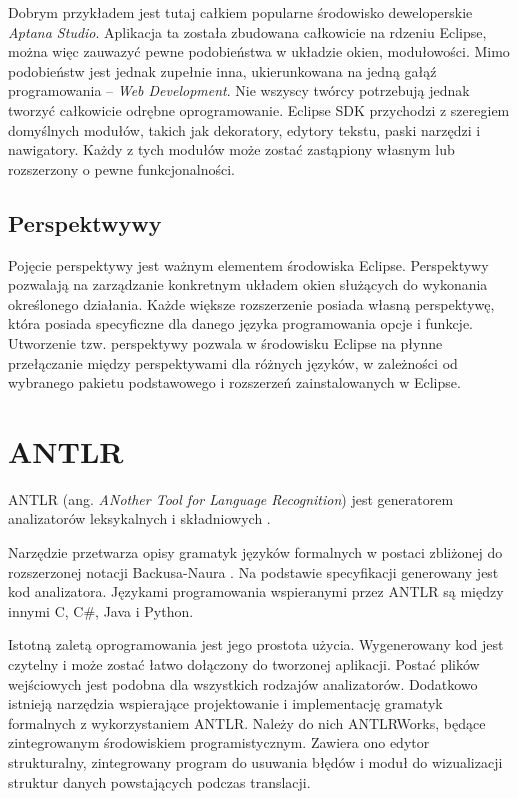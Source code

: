 Dobrym przykładem jest tutaj całkiem popularne środowisko deweloperskie \emph{Aptana Studio}. Aplikacja ta została zbudowana całkowicie na rdzeniu Eclipse, można więc zauwazyć pewne podobieństwa w układzie okien, modułowości. Mimo podobieństw jest jednak zupełnie inna, ukierunkowana na jedną gałąź programowania – \emph{Web Development}. Nie wszyscy twórcy potrzebują jednak tworzyć całkowicie odrębne oprogramowanie. Eclipse SDK przychodzi z szeregiem domyślnych modułów, takich jak dekoratory, edytory tekstu, paski narzędzi i nawigatory. Każdy z tych modułów może zostać zastąpiony własnym lub rozszerzony o pewne funkcjonalności.

\subsection{Perspektwywy}
Pojęcie perspektywy jest ważnym elementem środowiska Eclipse. Perspektywy pozwalają na zarządzanie konkretnym układem okien służących do wykonania określonego działania. Każde większe rozszerzenie posiada własną perspektywę, która posiada specyficzne dla danego języka programowania opcje i funkcje. Utworzenie tzw. perspektywy pozwala w środowisku Eclipse na płynne przełączanie między perspektywami dla różnych języków, w zależności od wybranego pakietu podstawowego i rozszerzeń zainstalowanych w Eclipse.

\section{ANTLR}
\label{sec:antlrśrodowisko}
ANTLR (ang. \emph{ANother Tool for Language Recognition}) jest generatorem
analizatorów leksykalnych i składniowych \cite{antlr}.

Narzędzie przetwarza opisy gramatyk języków formalnych w postaci 
zbliżonej do rozszerzonej notacji
 Backusa-Naura \cite{antlr}. Na podstawie specyfikacji generowany jest kod analizatora.
Językami programowania wspieranymi przez ANTLR są między innymi C, C\#, Java
i Python.

Istotną zaletą oprogramowania jest jego prostota użycia. Wygenerowany kod 
jest czytelny i może zostać łatwo dołączony do tworzonej aplikacji. Postać plików
wejściowych jest podobna dla wszystkich rodzajów analizatorów. Dodatkowo
istnieją narzędzia wspierające projektowanie i implementację gramatyk
formalnych z wykorzystaniem ANTLR. Należy do nich ANTLRWorks, będące
zintegrowanym środowiskiem programistycznym. Zawiera ono edytor strukturalny,
zintegrowany program do usuwania błędów i moduł do wizualizacji struktur 
danych powstających podczas translacji.

